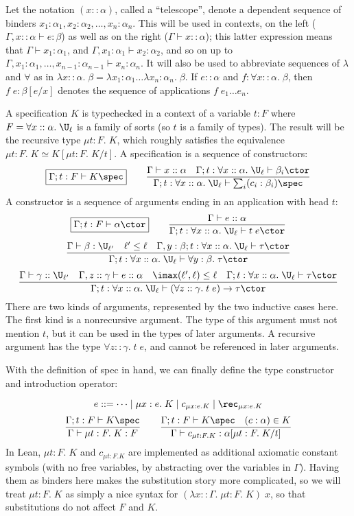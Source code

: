 Let the notation $(x :: \alpha)$, called a ``telescope'', denote a dependent sequence of binders $x_1:\alpha_1, x_2:\alpha_2,\dots, x_n:\alpha_n$. This will be used in contexts, on the left ($\Gamma,x::\alpha\vdash e:\beta$) as well as on the right ($\Gamma\vdash x::\alpha$); this latter expression means that $\Gamma\vdash x_1:\alpha_1$, and $\Gamma,x_1:\alpha_1\vdash x_2:\alpha_2$, and so on up to\\
$\Gamma,x_1:\alpha_1,\dots,x_{n-1}:\alpha_{n-1}\vdash x_n:\alpha_n$. It will also be used to abbreviate sequences of $\lambda$ and $\forall$ as in $\lambda x::\alpha.\;\beta=\lambda x_1:\alpha_1\dots\lambda x_n:\alpha_n.\;\beta$. If $e::\alpha$ and $f:\forall x::\alpha.\;\beta$, then $f\;e:\beta[e/x]$ denotes the sequence of applications $f\;e_1\dots e_n$.

A specification $K$ is typechecked in a context of a variable $t:F$ where $F=\forall x::\alpha.\;\U_\ell$ is a family of sorts (so $t$ is a family of types). The result will be the recursive type $\mu t:F.\;K$, which roughly satisfies the equivalence $\mu t:F.\;K\simeq K[\mu t:F.\;K/t]$. A specification is a sequence of constructors:
$$\boxed{\Gamma;t:F\vdash K\spec} \qquad
\frac{\Gamma\vdash x::\alpha\quad \Gamma;t:\forall x::\alpha.\;\U_\ell\vdash \beta_i\ctor}{\Gamma;t:\forall x::\alpha.\;\U_\ell\vdash \sum_i(c_i:\beta_i)\spec}$$
A constructor is a sequence of arguments ending in an application with head $t$:
$$\boxed{\Gamma;t:F\vdash \alpha\ctor} \qquad
\frac{\Gamma\vdash e::\alpha}{\Gamma;t:\forall x::\alpha.\;\U_\ell\vdash t\;e\ctor}$$
$$\frac{\Gamma\vdash \beta:\U_{\ell'}\quad \ell'\le\ell\quad \Gamma,y:\beta;t:\forall x::\alpha.\;\U_\ell\vdash\tau\ctor}{\Gamma;t:\forall x::\alpha.\;\U_\ell\vdash\forall y:\beta.\;\tau\ctor}$$
$$\frac{\Gamma\vdash \gamma::\U_{\ell'}\quad \Gamma,z::\gamma\vdash e::\alpha \quad
\imax(\ell',\ell)\le\ell\quad \Gamma;t:\forall x::\alpha.\;\U_\ell\vdash\tau\ctor}{\Gamma;t:\forall x::\alpha.\;\U_\ell\vdash(\forall z::\gamma.\;t\;e)\to\tau\ctor}$$
There are two kinds of arguments, represented by the two inductive cases here. The first kind is a nonrecursive argument. The type of this argument must not mention $t$, but it can be used in the types of later arguments. A recursive argument has the type $\forall z::\gamma.\;t\;e$, and cannot be referenced in later arguments.

With the definition of \textsf{spec} in hand, we can finally define the type constructor and introduction operator:

$$e::=\dots\mid\mu x:e.\;K\mid c_{\mu x:e.K}\mid\rec_{\mu x:e.K}$$
$$\frac{\Gamma;t:F\vdash K\spec}{\Gamma\vdash \mu t:F.\;K:F}\qquad
\frac{\Gamma;t:F\vdash K\spec\quad (c:\alpha)\in K}{\Gamma\vdash c_{\mu t:F.K}:\alpha[\mu t:F.\;K/t]}$$
In Lean, $\mu t:F.\;K$ and $c_{\mu t:F.K}$ are implemented as additional axiomatic constant symbols (with no free variables, by abstracting over the variables in $\Gamma$). Having them as binders here makes the substitution story more complicated, so we will treat $\mu t:F.\;K$ as simply a nice syntax for $(\lambda x::\Gamma.\;\mu t:F.\;K)\;x$, so that substitutions do not affect $F$ and $K$.

